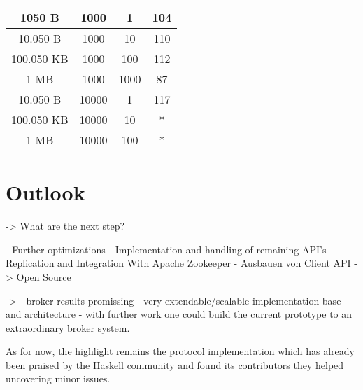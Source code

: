 \begin{table}[h]
\begin{tabular}{|c|c|c|c|}
1050 B                              & 1000                          & 1                & 104                                                                        \\ \hline
10.050 B                            & 1000                          & 10               & 110                                                                        \\ \hline
100.050 KB                          & 1000                          & 100              & 112                                                                        \\ \hline
1 MB                                & 1000                          & 1000             & 87                                                                         \\ \hline
10.050 B                            & 10000                         & 1                & 117                                                                        \\ \hline
100.050 KB                          & 10000                         & 10               & *                                                                          \\ \hline
1 MB                                & 10000                         & 100              & *                                                                          \\ \hline
\end{tabular}
\end{table}


\section{Outlook}
-> What are the next step? 

- Further optimizations 
- Implementation and handling of remaining API's 
- Replication and Integration With Apache Zookeeper 
- Ausbauen von Client API 
-> Open Source 

-> 
- broker results promissing
- very extendable/scalable implementation base and architecture
- with further work one could build the current prototype to an extraordinary
broker system.

As for now, the highlight remains the protocol implementation which has already
been praised by the Haskell community and found its contributors they helped
uncovering minor issues.


